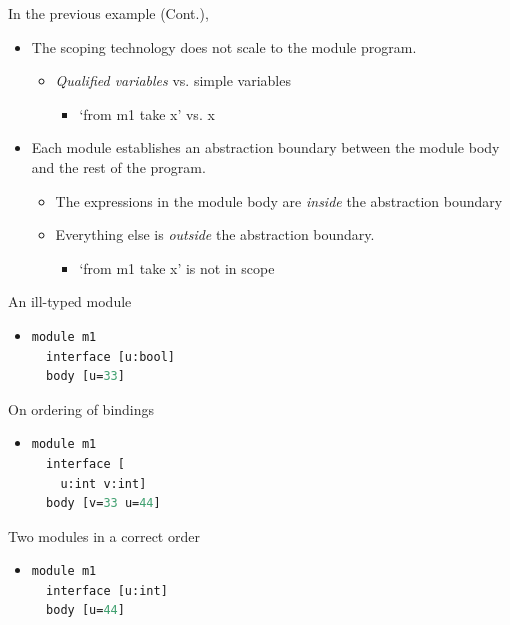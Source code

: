 \documentclass{article}
\begin{document}
\begin{huge}
In the previous example (Cont.),
\begin{itemize}
\item The scoping technology does not scale to the module program.
\begin{itemize}
\item {\it Qualified variables} vs. simple variables
\begin{itemize}
\item `from m1 take x' vs. x
\end{itemize}
\end{itemize}
\item Each module establishes an abstraction boundary between the module body
and the rest of the program. 
\begin{itemize}
\item The expressions in the module body are {\it inside} the abstraction boundary
\item Everything else is {\it outside} the abstraction boundary.
\begin{itemize}
\item `from m1 take x' is not in scope
\end{itemize}
\end{itemize}
\end{itemize}


\begin{minipage}[t]{.5\textwidth}
An ill-typed module
\begin{itemize}
\item
\begin{lstlisting}[language=Lisp]
module m1 
  interface [u:bool]
  body [u=33]
\end{lstlisting}
\end{itemize}

On ordering of bindings
\begin{itemize}
\item
\begin{lstlisting}[language=Lisp]
module m1 
  interface [
    u:int v:int]
  body [v=33 u=44]
\end{lstlisting}
\end{itemize}
\end{minipage}
\begin{minipage}[t]{.5\textwidth}
Two modules in a correct order
\begin{itemize}
\item
\begin{lstlisting}[language=Lisp]
module m1 
  interface [u:int]
  body [u=44]
  

\end{lstlisting}
\end{itemize}
\end{minipage}
\end{huge}
\end{document}
